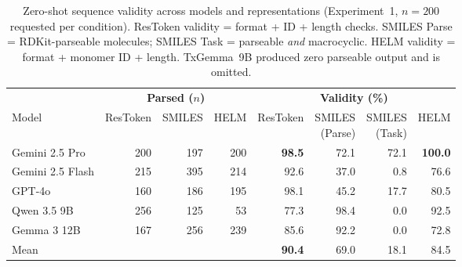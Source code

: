 \begin{table}[htbp]
\centering
\caption{Zero-shot sequence validity across models and representations (Experiment~1, $n=200$ requested per condition). ResToken validity = format + ID + length checks. SMILES Parse = RDKit-parseable molecules; SMILES Task = parseable \emph{and} macrocyclic. HELM validity = format + monomer ID + length. TxGemma~9B produced zero parseable output and is omitted.}
\label{tab:w2-exp1-validity}
\small
\begin{tabular}{l *{3}{r} *{4}{r}}
\toprule
& \multicolumn{3}{c}{\textbf{Parsed ($n$)}} & \multicolumn{4}{c}{\textbf{Validity (\%)}} \\
\cmidrule(lr){2-4} \cmidrule(lr){5-8}
Model & ResToken & SMILES & HELM & ResToken & \shortstack{SMILES\\(Parse)} & \shortstack{SMILES\\(Task)} & HELM \\
\midrule
Gemini 2.5 Pro & 200 & 197 & 200 & \textbf{98.5} & 72.1 & 72.1 & \textbf{100.0} \\
Gemini 2.5 Flash & 215 & 395 & 214 & 92.6 & 37.0 & 0.8 & 76.6 \\
GPT-4o & 160 & 186 & 195 & 98.1 & 45.2 & 17.7 & 80.5 \\
Qwen 3.5 9B & 256 & 125 & 53 & 77.3 & 98.4 & 0.0 & 92.5 \\
Gemma 3 12B & 167 & 256 & 239 & 85.6 & 92.2 & 0.0 & 72.8 \\
\midrule
Mean & & & & \textbf{90.4} & 69.0 & 18.1 & 84.5 \\
\bottomrule
\end{tabular}
\end{table}